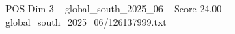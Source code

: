 \begin{textsample}{POS Dim 3 – global\_south\_2025\_06 – Score 24.00 – global\_south\_2025\_06/126137999.txt}
\end{textsample}
